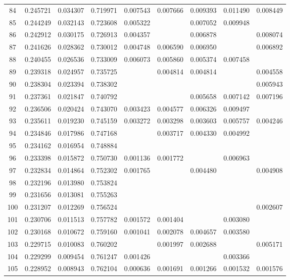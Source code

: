 \documentclass{elsarticle}
\begin{document}
\begin{center}
\begin{longtable}{|c|ccc|cccc|c|}
  84 & 0.245721 & 0.034307 & 0.719971 & 0.007543 & 0.007666 & 0.009393 & 0.011490 & 0.008449 \\
  85 & 0.244249 & 0.032143 & 0.723608 & 0.005322 &  & 0.007052 & 0.009948 &  \\
  86 & 0.242912 & 0.030175 & 0.726913 & 0.004357 &  & 0.006878 &  & 0.008074 \\
  87 & 0.241626 & 0.028362 & 0.730012 & 0.004748 & 0.006590 & 0.006950 &  & 0.006892 \\
  88 & 0.240455 & 0.026536 & 0.733009 & 0.006073 & 0.005860 & 0.005374 & 0.007458 &  \\
  89 & 0.239318 & 0.024957 & 0.735725 &  & 0.004814 & 0.004814 &  & 0.004558 \\
  90 & 0.238304 & 0.023394 & 0.738302 &  &  &  &  & 0.005943 \\
  91 & 0.237361 & 0.021847 & 0.740792 &  &  & 0.005658 & 0.007142 & 0.007196 \\
  92 & 0.236506 & 0.020424 & 0.743070 & 0.003423 & 0.004577 & 0.006326 & 0.009497 &  \\
  93 & 0.235611 & 0.019230 & 0.745159 & 0.003272 & 0.003298 & 0.003603 & 0.005757 & 0.004246 \\
  94 & 0.234846 & 0.017986 & 0.747168 &  & 0.003717 & 0.004330 & 0.004992 &  \\
  95 & 0.234162 & 0.016954 & 0.748884 &  &  &  &  &  \\
  96 & 0.233398 & 0.015872 & 0.750730 & 0.001136 & 0.001772 &  & 0.006963 &  \\
  97 & 0.232834 & 0.014864 & 0.752302 & 0.001765 &  & 0.004480 &  & 0.004908 \\
  98 & 0.232196 & 0.013980 & 0.753824 &  &  &  &  &  \\
  99 & 0.231656 & 0.013081 & 0.755263 &  &  &  &  &  \\
  100 & 0.231207 & 0.012269 & 0.756524 &  &  &  &  & 0.002607 \\
  101 & 0.230706 & 0.011513 & 0.757782 & 0.001572 & 0.001404 &  & 0.003080 &  \\
  102 & 0.230168 & 0.010672 & 0.759160 & 0.001041 & 0.002078 & 0.004657 & 0.003580 &  \\
  103 & 0.229715 & 0.010083 & 0.760202 &  & 0.001997 & 0.002688 &  & 0.005171 \\
  104 & 0.229299 & 0.009454 & 0.761247 & 0.001426 &  &  & 0.003366 &  \\
  105 & 0.228952 & 0.008943 & 0.762104 & 0.000636 & 0.001691 & 0.001266 & 0.001532 & 0.001576 \\

\end{longtable}
\end{center}
\end{document}
